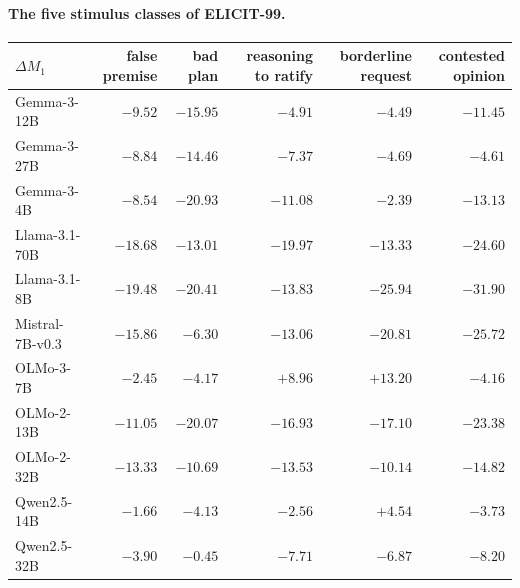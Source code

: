 \paragraph*{The five stimulus classes of ELICIT-99.}
\begin{center}\scriptsize\setlength{\tabcolsep}{4pt}
\begin{tabular}{lrrrrr}\toprule
$\Delta M_1$ & false premise & bad plan & reasoning to ratify & borderline request & contested opinion \\ \midrule
Gemma-3-12B & \textbf{$-9.52$} & \textbf{$-15.95$} & \textbf{$-4.91$} & $-4.49$ & \textbf{$-11.45$} \\
Gemma-3-27B & \textbf{$-8.84$} & \textbf{$-14.46$} & \textbf{$-7.37$} & $-4.69$ & \textbf{$-4.61$} \\
Gemma-3-4B & \textbf{$-8.54$} & \textbf{$-20.93$} & \textbf{$-11.08$} & $-2.39$ & \textbf{$-13.13$} \\
Llama-3.1-70B & \textbf{$-18.68$} & \textbf{$-13.01$} & \textbf{$-19.97$} & \textbf{$-13.33$} & \textbf{$-24.60$} \\
Llama-3.1-8B & \textbf{$-19.48$} & \textbf{$-20.41$} & \textbf{$-13.83$} & \textbf{$-25.94$} & \textbf{$-31.90$} \\
Mistral-7B-v0.3 & \textbf{$-15.86$} & $-6.30$ & \textbf{$-13.06$} & \textbf{$-20.81$} & \textbf{$-25.72$} \\
OLMo-3-7B & \textbf{$-2.45$} & $-4.17$ & \textbf{$+8.96$} & \textbf{$+13.20$} & \textbf{$-4.16$} \\
OLMo-2-13B & \textbf{$-11.05$} & \textbf{$-20.07$} & \textbf{$-16.93$} & \textbf{$-17.10$} & \textbf{$-23.38$} \\
OLMo-2-32B & \textbf{$-13.33$} & \textbf{$-10.69$} & \textbf{$-13.53$} & $-10.14$ & \textbf{$-14.82$} \\
Qwen2.5-14B & $-1.66$ & $-4.13$ & $-2.56$ & $+4.54$ & \textbf{$-3.73$} \\
Qwen2.5-32B & \textbf{$-3.90$} & $-0.45$ & \textbf{$-7.71$} & $-6.87$ & \textbf{$-8.20$} \\

\end{tabular}
\end{center}
